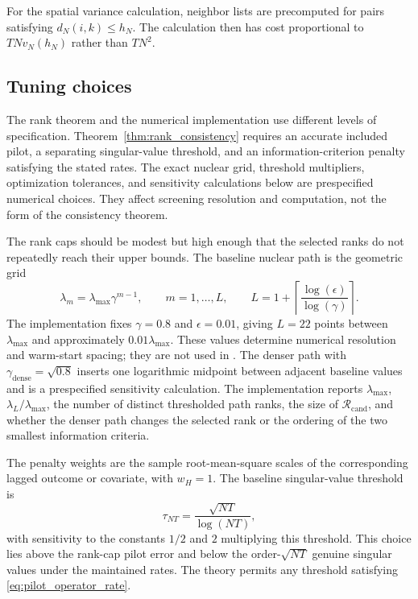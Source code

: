 \documentclass[11pt]{article}
\numberwithin{equation}{section}
\theoremstyle{remark}
\newcommand{\calR}{\mathcal R}
\begin{document}
For the spatial variance calculation, neighbor lists are precomputed for pairs satisfying $d_N(i,k)\le h_N$. The calculation then has cost proportional to $TNv_N(h_N)$ rather than $TN^2$.

\subsection{Tuning choices}
\label{subsec:tuning}

The rank theorem and the numerical implementation use different levels of specification. Theorem~\ref{thm:rank_consistency} requires an accurate included pilot, a separating singular-value threshold, and an information-criterion penalty satisfying the stated rates. The exact nuclear grid, threshold multipliers, optimization tolerances, and sensitivity calculations below are prespecified numerical choices. They affect screening resolution and computation, not the form of the consistency theorem.

The rank caps should be modest but high enough that the selected ranks do not repeatedly reach their upper bounds. The baseline nuclear path is the geometric grid
\begin{equation}
\label{eq:rank_lambda_grid}
\lambda_m
=
\lambda_{\max}\gamma^{m-1},
\qquad
m=1,\ldots,L,
\qquad
L
=
1+
\left\lceil
\frac{\log(\epsilon)}{\log(\gamma)}
\right\rceil.
\end{equation}
The implementation fixes $\gamma=0.8$ and $\epsilon=0.01$, giving $L=22$ points between $\lambda_{\max}$ and approximately $0.01\lambda_{\max}$. These values determine numerical resolution and warm-start spacing; they are not used in . The denser path with $\gamma_{\mathrm{dense}}=\sqrt{0.8}$ inserts one logarithmic midpoint between adjacent baseline values and is a prespecified sensitivity calculation. The implementation reports $\lambda_{\max}$, $\lambda_L/\lambda_{\max}$, the number of distinct thresholded path ranks, the size of $\calR_{\mathrm{cand}}$, and whether the denser path changes the selected rank or the ordering of the two smallest information criteria.

The penalty weights are the sample root-mean-square scales of the corresponding lagged outcome or covariate, with $w_H=1$. The baseline singular-value threshold is
$$
\tau_{NT}=\frac{\sqrt{NT}}{\log(NT)},
$$
with sensitivity to the constants $1/2$ and $2$ multiplying this threshold. This choice lies above the rank-cap pilot error and below the order-$\sqrt{NT}$ genuine singular values under the maintained rates. The theory permits any threshold satisfying \eqref{eq:pilot_operator_rate}.
\end{document}

